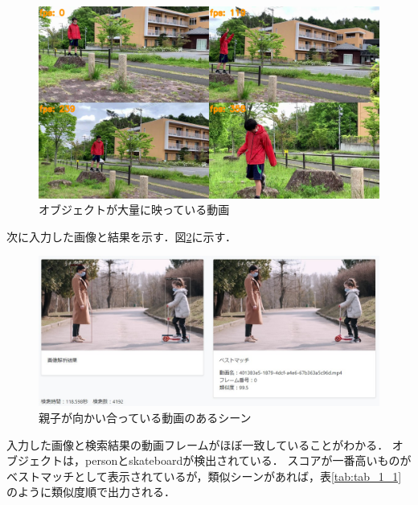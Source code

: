 \documentclass[a4j,12pt,dvipdfmx]{jreport}
\begin{document}
\begin{figure}[H]
  \centering
  \includegraphics[width=13cm]{image/5_result.jpg}
  \caption{オブジェクトが大量に映っている動画}
  \label{fig:movie5}
\end{figure}

次に入力した画像と結果を示す．図\ref{fig:img_1_1}に示す．
\begin{figure}[H]
  \centering
  \includegraphics[width=13cm]{image/result_1_1.jpg}
  \caption{親子が向かい合っている動画のあるシーン}
  \label{fig:img_1_1}
\end{figure}

入力した画像と検索結果の動画フレームがほぼ一致していることがわかる．
オブジェクトは，personとskateboardが検出されている．
スコアが一番高いものがベストマッチとして表示されているが，類似シーンがあれば，表\ref{tab:tab_1_1}のように類似度順で出力される．
\end{document}
